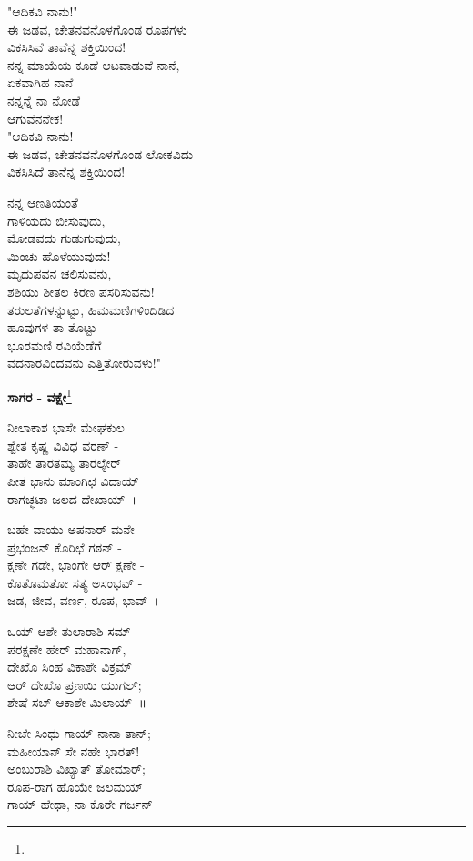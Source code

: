 "ಆದಿಕವಿ ನಾನು!"\\ಈ ಜಡವ, ಚೇತನವನೊಳಗೊಂಡ ರೂಪಗಳು\\ವಿಕಸಿಸಿವೆ ತಾವೆನ್ನ ಶಕ್ತಿಯಿಂದ!\\ನನ್ನ ಮಾಯೆಯ ಕೂಡೆ ಆಟವಾಡುವೆ ನಾನೆ,\\ಏಕವಾಗಿಹ ನಾನೆ\\ನನ್ನನ್ನೆ ನಾ ನೋಡೆ\\ಆಗುವೆನನೇಕ!\\

"ಆದಿಕವಿ ನಾನು!\\ಈ ಜಡವ, ಚೇತನವನೊಳಗೊಂಡ ಲೋಕವಿದು\\ವಿಕಸಿಸಿದೆ ತಾನೆನ್ನ ಶಕ್ತಿಯಿಂದ!

ನನ್ನ ಆಣತಿಯಂತೆ\\ಗಾಳಿಯದು ಬೀಸುವುದು,\\ಮೋಡವದು ಗುಡುಗುವುದು,\\ಮಿಂಚು ಹೊಳೆಯುವುದು!\\
 ಮೃದುಪವನ ಚಲಿಸುವನು,\\ಶಶಿಯು ಶೀತಲ ಕಿರಣ ಪಸರಿಸುವನು!\\ತರುಲತೆಗಳನ್ನುಟ್ಟು, ಹಿಮಮಣಿಗಳಿಂದಿಡಿದ\\ಹೂವುಗಳ ತಾ ತೊಟ್ಟು\\ಭೂರಮಣಿ ರವಿಯೆಡೆಗೆ\\ವದನಾರವಿಂದವನು ಎತ್ತಿತೋರುವಳು!"

\begin{center}
\textbf{ಸಾಗರ - ವಕ್ಷೇ}\footnote{}
\end{center}

ನೀಲಾಕಾಶ ಭಾಸೇ ಮೇಘಕುಲ\\ಶ್ವೇತ ಕೃಷ್ಣ ವಿವಿಧ ವರಣ್ -\\ತಾಹೇ ತಾರತಮ್ಯ ತಾರಲ್ಯೇರ್\\ಪೀತ ಭಾನು ಮಾಂಗಿಛ ವಿದಾಯ್\\ರಾಗಚ್ಛಟಾ ಜಲದ ದೇಖಾಯ್~।

ಬಹೇ ವಾಯು ಅಪನಾರ್ ಮನೇ\\ಪ್ರಭಂಜನ್ ಕೊರಿಛೆ ಗಠನ್ -\\ಕ್ಷಣೇ ಗಡೇ, ಭಾಂಗೇ ಆರ್ ಕ್ಷಣೇ -\\ಕೊತೊಮತೋ ಸತ್ಯ ಅಸಂಭವ್ -\\ಜಡ, ಜೀವ, ವರ್ಣ, ರೂಪ, ಭಾವ್~।

ಒಯ್ ಆಶೇ ತುಲಾರಾಶಿ ಸಮ್\\ಪರಕ್ಷಣೇ ಹೇರ್‌ ಮಹಾನಾಗ್,\\ದೇಖೊ ಸಿಂಹ ವಿಕಾಶೇ ವಿಕ್ರಮ್\\ಆರ್ ದೇಖೊ ಪ್ರಣಯಿ ಯುಗಲ್;\\ಶೇಷೆ ಸಬ್ ಆಕಾಶೇ ಮಿಲಾಯ್~॥

ನೀಚೇ ಸಿಂಧು ಗಾಯ್ ನಾನಾ ತಾನ್;\\ಮಹೀಯಾನ್ ಸೇ ನಹೇ ಭಾರತ್!\\ಅಂಬುರಾಶಿ ವಿಖ್ಯಾತ್ ತೋಮಾರ್;\\ರೂಪ-ರಾಗ ಹೊಯೇ ಜಲಮಯ್\\ಗಾಯ್ ಹೇಥಾ, ನಾ ಕೊರೇ ಗರ್ಜನ್

